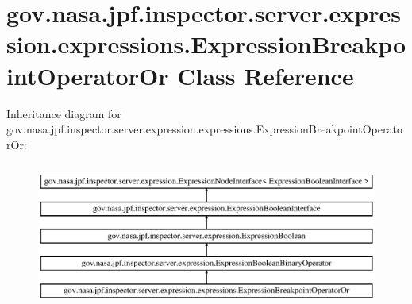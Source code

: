 \hypertarget{classgov_1_1nasa_1_1jpf_1_1inspector_1_1server_1_1expression_1_1expressions_1_1_expression_breakpoint_operator_or}{}\section{gov.\+nasa.\+jpf.\+inspector.\+server.\+expression.\+expressions.\+Expression\+Breakpoint\+Operator\+Or Class Reference}
\label{classgov_1_1nasa_1_1jpf_1_1inspector_1_1server_1_1expression_1_1expressions_1_1_expression_breakpoint_operator_or}
Inheritance diagram for gov.\+nasa.\+jpf.\+inspector.\+server.\+expression.\+expressions.\+Expression\+Breakpoint\+Operator\+Or\+:\begin{figure}[H]
\begin{center}
\leavevmode
\includegraphics[height=4.827586cm]{classgov_1_1nasa_1_1jpf_1_1inspector_1_1server_1_1expression_1_1expressions_1_1_expression_breakpoint_operator_or}
\end{center}
\end{figure}
